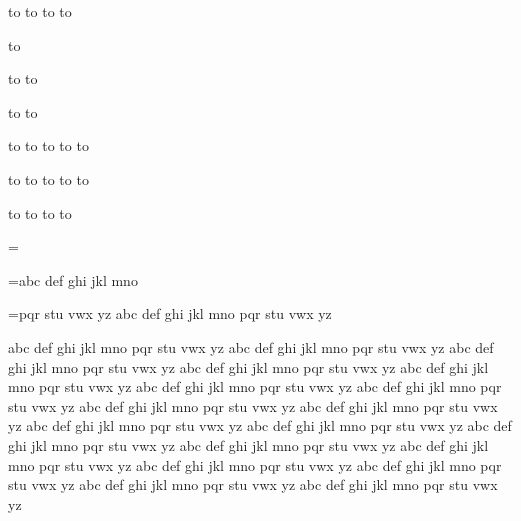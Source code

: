 \vbox to 
\eject
\vbox to 
\eject
\vbox to 
\eject
\vbox to 
\eject

\vbox to 
\eject

\vbox to 
\eject
\vbox to 
\eject

\vbox to 
\eject
\vbox to 
\eject

\vbox to 
\eject
\vbox to 
\eject
\vbox to 
\eject
\vbox to 
\eject
\vbox to 
\eject

\vbox to 
\eject
\vbox to 
\eject
\vbox to 
\eject
\vbox to 
\eject
\vbox to 
\eject

\vbox to 
\eject
\vbox to 
\eject
\vbox to 
\eject
\vbox to 
\eject

\bye

\tracingall
{}

\newbox\collectbox

\collectbox=\vbox{}

\collectbox=\vbox{\unvcopy\collectbox abc def ghi jkl mno}

\unvcopy\collectbox

\vskip1in

\collectbox=\vbox{\unvcopy\collectbox pqr stu vwx yz abc def ghi jkl mno pqr stu vwx yz}

\unvcopy\collectbox


\bye


abc def ghi jkl mno pqr stu vwx yz abc def ghi jkl mno pqr stu vwx yz
abc def ghi jkl mno pqr stu vwx yz abc def ghi jkl mno pqr stu vwx yz
abc def ghi jkl mno pqr stu vwx yz abc def ghi jkl mno pqr stu vwx yz
abc def ghi jkl mno pqr stu vwx yz abc def ghi jkl mno pqr stu vwx yz
abc def ghi jkl mno pqr stu vwx yz abc def ghi jkl mno pqr stu vwx yz
abc def ghi jkl mno pqr stu vwx yz abc def ghi jkl mno pqr stu vwx yz
abc def ghi jkl mno pqr stu vwx yz abc def ghi jkl mno pqr stu vwx yz
abc def ghi jkl mno pqr stu vwx yz abc def ghi jkl mno pqr stu vwx yz
abc def ghi jkl mno pqr stu vwx yz abc def ghi jkl mno pqr stu vwx yz




\bye


